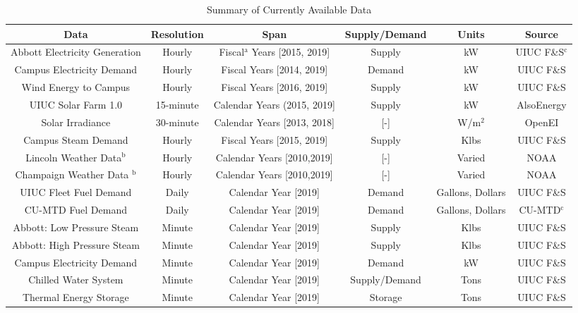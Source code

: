 \begin{landscape}

  \begin{table}
    \centering
    \caption{Summary of Currently Available Data}
    \label{tab:datasummary}
    \begin{tabular}{c|c|c|c|c|c}
      \hline
      Data & Resolution & Span & Supply/Demand & Units & Source\\
      \hline
      Abbott Electricity Generation & Hourly & Fiscal$^{\text{a}}$ Years [2015, 2019]& Supply & kW & UIUC F\&S$^{\text{c}}$\\
      Campus Electricity Demand & Hourly & Fiscal Years [2014, 2019] & Demand & kW & UIUC F\&S \\
      Wind Energy to Campus & Hourly & Fiscal Years [2016, 2019] & Supply & kW & UIUC F\&S \\
      UIUC Solar Farm 1.0 & 15-minute & Calendar Years (2015, 2019] & Supply & kW & AlsoEnergy \cite{alsoenergy_university_2019}\\
      Solar Irradiance & 30-minute & Calendar Years [2013, 2018]& [-] & W/m$^2$& OpenEI \cite{sengupta_national_2018}\\
      Campus Steam Demand & Hourly & Fiscal Years [2015, 2019] & Supply & Klbs & UIUC F\&S\\
      Lincoln Weather Data$^{\text{b}}$ & Hourly & Calendar Years [2010,2019] & [-] & Varied & NOAA \cite{noauthor_climate_nodate} \\
      Champaign Weather Data $^{\text{b}}$& Hourly & Calendar Years [2010,2019]& [-] & Varied & NOAA \cite{noauthor_climate_nodate}\\
      UIUC Fleet Fuel Demand & Daily & Calendar Year [2019]& Demand & Gallons, Dollars & UIUC F\&S \\
      CU-MTD Fuel Demand & Daily & Calendar Year [2019]& Demand & Gallons, Dollars & CU-MTD$^{\text{c}}$ \\
      Abbott: Low Pressure Steam & Minute & Calendar Year [2019] & Supply & Klbs & UIUC F\&S\\
      Abbott: High Pressure Steam & Minute & Calendar Year [2019] & Supply & Klbs & UIUC F\&S\\
      Campus Electricity Demand & Minute & Calendar Year [2019] & Demand & kW & UIUC F\&S\\
      Chilled Water System & Minute & Calendar Year [2019] & Supply/Demand & Tons & UIUC F\&S\\
      Thermal Energy Storage & Minute & Calendar Year [2019] & Storage & Tons & UIUC F\&S\\

\end{tabular}
\end{table}
\end{landscape}
